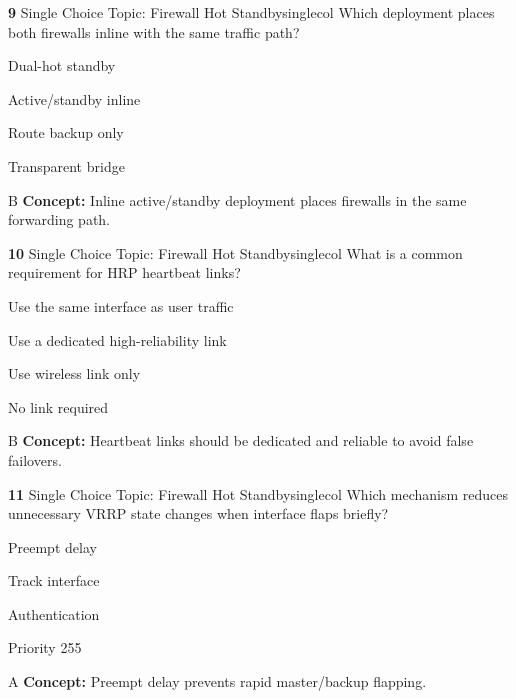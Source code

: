 \documentclass[10pt,a4paper]{article}
\begin{document}
\begin{qcard}{\color{white}\textbf{9} \hfill \small Single Choice \textbar{} Topic: Firewall Hot Standby}{singlecol}
Which deployment places both firewalls inline with the same traffic path?

\begin{qoptions}
\item Dual-hot standby
\item Active/standby inline
\item Route backup only
\item Transparent bridge
\end{qoptions}
\begin{explainbox}{B}
\textbf{Concept:} Inline active/standby deployment places firewalls in the same forwarding path.
\end{explainbox}
\end{qcard}

\begin{qcard}{\color{white}\textbf{10} \hfill \small Single Choice \textbar{} Topic: Firewall Hot Standby}{singlecol}
What is a common requirement for HRP heartbeat links?

\begin{qoptions}
\item Use the same interface as user traffic
\item Use a dedicated high-reliability link
\item Use wireless link only
\item No link required
\end{qoptions}
\begin{explainbox}{B}
\textbf{Concept:} Heartbeat links should be dedicated and reliable to avoid false failovers.
\end{explainbox}
\end{qcard}

\begin{qcard}{\color{white}\textbf{11} \hfill \small Single Choice \textbar{} Topic: Firewall Hot Standby}{singlecol}
Which mechanism reduces unnecessary VRRP state changes when interface flaps briefly?

\begin{qoptions}
\item Preempt delay
\item Track interface
\item Authentication
\item Priority 255
\end{qoptions}
\begin{explainbox}{A}
\textbf{Concept:} Preempt delay prevents rapid master/backup flapping.
\end{explainbox}
\end{qcard}
\end{document}
